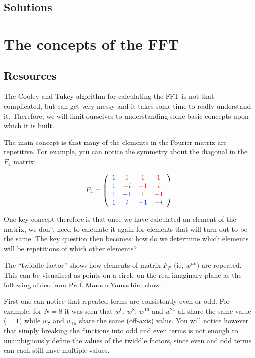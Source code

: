 \subsection*{Solutions}




\newpage
\section{The concepts of the FFT}

\subsection*{Resources}
The Cooley and Tukey algorithm for calculating the FFT is not that complicated, but can get very messy and it takes some time to really understand it. Therefore, we will limit ourselves to understanding some basic concepts upon which it is built.

The main concept is that many of the elements in the Fourier matrix are repetitive. For example, you can notice the symmetry about the diagonal in the $F_4$ matrix:

\begin{equation}
   F_4 = \left(
\begin{array}{cccc}
    1 & \textcolor{red}{1} & \textcolor{red}{1} & \textcolor{red}{1} \\
    \textcolor{blue}{1} & -i & \textcolor{red}{-1} & \textcolor{red}{i} \\
    \textcolor{blue}{1} & \textcolor{blue}{-1} & 1 & \textcolor{red}{-1} \\
    \textcolor{blue}{1} & \textcolor{blue}{i} & \textcolor{blue}{-1} & -i \\
\end{array}
\right) 
\end{equation}

One key concept therefore is that once we have calculated an element of the matrix, we don't need to calculate it again for elements that will turn out to be the same. The key question then becomes: how do we determine which elements will be repetitions of which other elements?

The ``twiddle factor'' shows how elements of matrix $F_N$ (ie, $w^{nk}$) are repeated. This can be visualised as points on a circle on the real-imaginary plane as the following slides from Prof. Maraso Yamashiro show.



First one can notice that repeated terms are consistently even or odd. For example, for $N=8$ it was seen that $w^0$, $w^8$, $w^{16}$ and $w^{24}$ all share the same value ($=1$) while $w_7$ and $w_{15}$ share the same (off-axis) value. You will notice however that simply breaking the functions into odd and even terms is not enough to unambiguously define the values of the twiddle factors, since even and odd terms can each still have multiple values.

